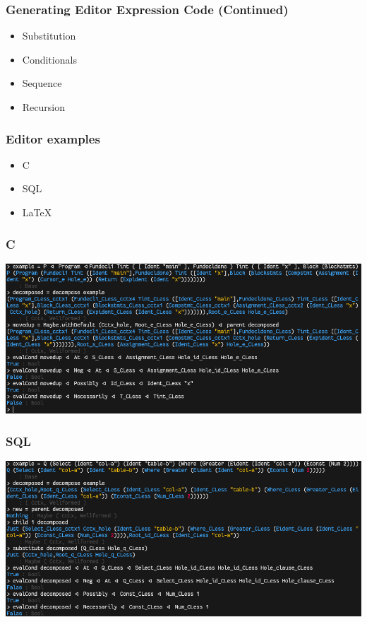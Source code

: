 \documentclass[t,24pt,aspectratio=169]{beamer}
\begin{document}
\begin{frame}[hvid]
    \frametitle{Generating Editor Expression Code (Continued)}
    \begin{itemize}
        \item Substitution
        \item Conditionals
        \item Sequence
        \item Recursion
    \end{itemize}
\end{frame}


\begin{frame}[hvid]
    \frametitle{Editor examples}
    \begin{itemize}
        \item C
        \item SQL
        \item \LaTeX
    \end{itemize}
\end{frame}


\begin{frame}[hvid]
    \frametitle{C}
    \includegraphics[width=\textwidth]{img/c-repl.png}
\end{frame}

\begin{frame}[hvid]
    \frametitle{SQL}
    \includegraphics[width=\textwidth]{img/sql-repl.png}
\end{frame}
\end{document}
